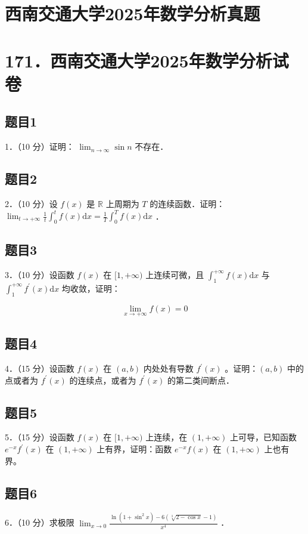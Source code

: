 \documentclass{article}
\begin{document}
\section*{西南交通大学2025年数学分析真题}
\section*{171．西南交通大学2025年数学分析试卷}

\subsection{题目1}
1．（10 分）证明： \(\lim _{n \rightarrow \infty} \sin n\) 不存在．

\subsection{题目2}
2．（10 分）设 \(f(x)\) 是 \(\mathbb{R}\) 上周期为 \(T\) 的连续函数．证明： \(\lim _{t \rightarrow+\infty} \frac{1}{t} \int_{0}^{t} f(x) \mathrm{d} x=\frac{1}{T} \int_{0}^{T} f(x) \mathrm{d} x\) ．

\subsection{题目3}
3．（10 分）设函数 \(f(x)\) 在 \([1,+\infty)\) 上连续可微，且 \(\int_{1}^{+\infty} f(x) \mathrm{d} x\) 与 \(\int_{1}^{+\infty} f^{\prime}(x) \mathrm{d} x\) 均收敛，证明：

\[
\lim _{x \rightarrow+\infty} f(x)=0
\]

\subsection{题目4}
4．（15 分）设函数 \(f(x)\) 在 \((a, b)\) 内处处有导数 \(f^{\prime}(x)\) 。证明：\((a, b)\) 中的点或者为 \(f^{\prime}(x)\) 的连续点，或者为 \(f^{\prime}(x)\) 的第二类间断点．

\subsection{题目5}
5．（15 分）设函数 \(f(x)\) 在 \([1,+\infty)\) 上连续，在 \((1,+\infty)\) 上可导，已知函数 \(e^{-x} f^{\prime}(x)\) 在 \((1,+\infty)\) 上有界，证明：函数 \(e^{-x} f(x)\) 在 \((1,+\infty)\) 上也有界。

\subsection{题目6}
6．（10 分）求极限 \(\lim _{x \rightarrow 0} \frac{\ln \left(1+\sin ^{2} x\right)-6(\sqrt[3]{2-\cos x}-1)}{x^{4}}\) ．
\end{document}
